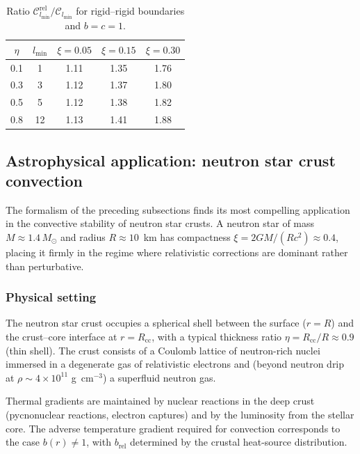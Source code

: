 \begin{table}[ht]
\centering
\caption{Ratio
$\mathcal{C}_{l_{\min}}^{\mathrm{rel}}/\mathcal{C}_{l_{\min}}$
for rigid--rigid boundaries and $b=c=1$.}
\label{tab:rel-shells-summary}
\begin{tabular}{c c c c c}
\hline
$\eta$ & $l_{\min}$ & $\xi=0.05$ & $\xi=0.15$ & $\xi=0.30$ \\
\hline
0.1 & 1 & 1.11 & 1.35 & 1.76 \\
0.3 & 3 & 1.12 & 1.37 & 1.80 \\
0.5 & 5 & 1.12 & 1.38 & 1.82 \\
0.8 & 12 & 1.13 & 1.41 & 1.88 \\
\hline
\end{tabular}
\end{table}

\subsection{Astrophysical application: neutron star crust convection}
\label{sec:rel-60-astro}

The formalism of the preceding subsections finds its most compelling
application in the convective stability of neutron star crusts.  A
neutron star of mass $M\approx 1.4\,M_{\odot}$ and radius
$R\approx 10$~km has compactness $\xi = 2GM/(Rc^{2})\approx 0.4$,
placing it firmly in the regime where relativistic corrections are
dominant rather than perturbative.

\subsubsection{Physical setting}

The neutron star crust occupies a spherical shell between the
surface ($r=R$) and the crust--core interface at $r=R_{\mathrm{cc}}$,
with a typical thickness ratio $\eta = R_{\mathrm{cc}}/R\approx 0.9$
(thin shell).  The crust consists of a Coulomb lattice of
neutron-rich nuclei immersed in a degenerate gas of relativistic
electrons and (beyond neutron drip at $\rho\sim 4\times 10^{11}$
g~cm$^{-3}$) a superfluid neutron gas.

Thermal gradients are maintained by nuclear reactions in the deep
crust (pycnonuclear reactions, electron captures) and by the
luminosity from the stellar core.  The adverse temperature gradient
required for convection corresponds to the case $b(r)\neq 1$, with
$b_{\mathrm{rel}}$ determined by the crustal heat-source
distribution.

